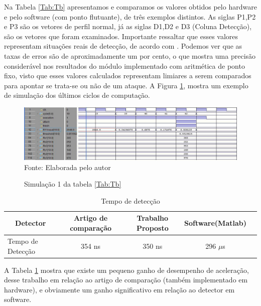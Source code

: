 Na Tabela \ref{Tab:Tb} apresentamos e comparamos os valores obtidos pelo hardware e pelo software (com ponto flutuante), de  três exemplos distintos. As siglas P1,P2 e P3 são os vetores de perfil normal, já as siglas D1,D2 e D3 (Coluna Detecção), são os vetores que foram examinados. Importante ressaltar que esses valores representam situações reais de detecção, de acordo com  . Podemos ver que as taxas de erros são de aproximadamente um por cento, o que mostra uma precisão considerável nos resultados do módulo implementado com aritmética de ponto fixo, visto que esses valores calculados representam limiares a serem comparados para apontar se trata-se ou não de um ataque. A Figura \ref{simu}, mostra um exemplo de simulação dos últimos ciclos de computação. 

\begin{figure}[H]
	\centering
		\caption{Simulação 1 da tabela  \ref{Tab:Tb}}
	\includegraphics[width=14cm]{figures/simu.jpg}\\

		{Fonte: Elaborada pelo autor}
	
	\label{simu}
\end{figure}



\begin{table}[H]
	\centering
	\caption{Tempo de detecção}
	\label{Tab:TD}
	\begin{tabular}{lcccc}
		\hline
		\multicolumn{1}{c}{Detector}&\multicolumn{1}{c}{Artigo de comparação }&\multicolumn{1}{c}{Trabalho Proposto}&\multicolumn{1}{c}{Software(Matlab)}
		\\ \midrule
		
		Tempo de Detecção &  354 ns  &  350 ns & 296 $\mu$s  \\   \midrule
	
	\end{tabular}
\end{table}

A Tabela \ref{Tab:TD} mostra que existe um pequeno ganho de desempenho de aceleração, desse trabalho em relação ao artigo de comparação (também implementado em hardware), e obviamente um ganho significativo em relação ao detector em software.

